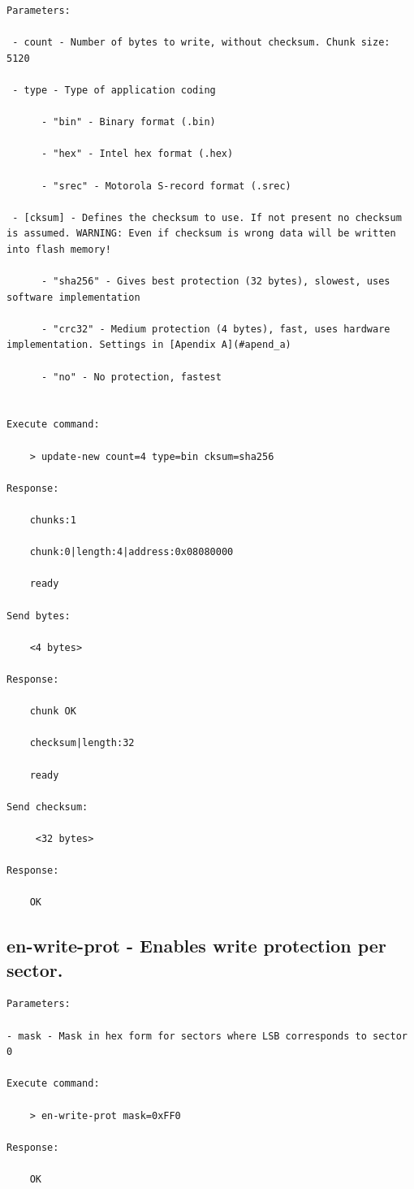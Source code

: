 \begin{lstlisting}
Parameters:

 - count - Number of bytes to write, without checksum. Chunk size: 5120
 
 - type - Type of application coding
       
      - "bin" - Binary format (.bin)
                
      - "hex" - Intel hex format (.hex)
      
      - "srec" - Motorola S-record format (.srec)
 
 - [cksum] - Defines the checksum to use. If not present no checksum is assumed. WARNING: Even if checksum is wrong data will be written into flash memory!
 
      - "sha256" - Gives best protection (32 bytes), slowest, uses software implementation
           
      - "crc32" - Medium protection (4 bytes), fast, uses hardware implementation. Settings in [Apendix A](#apend_a)

      - "no" - No protection, fastest


Execute command: 

    > update-new count=4 type=bin cksum=sha256
    
Response: 

    chunks:1

    chunk:0|length:4|address:0x08080000

    ready
    
Send bytes:

    <4 bytes>
    
Response:

    chunk OK

    checksum|length:32

    ready
 
Send checksum:
     
     <32 bytes>
     
Response:
 
    OK
\end{lstlisting}

\subsection{en-write-prot - Enables write protection per sector.}
\label{bl_cmd:en-write-prot}

\begin{lstlisting}
Parameters:

- mask - Mask in hex form for sectors where LSB corresponds to sector 0

Execute command: 

    > en-write-prot mask=0xFF0
    
Response: 

    OK
\end{lstlisting}
    
